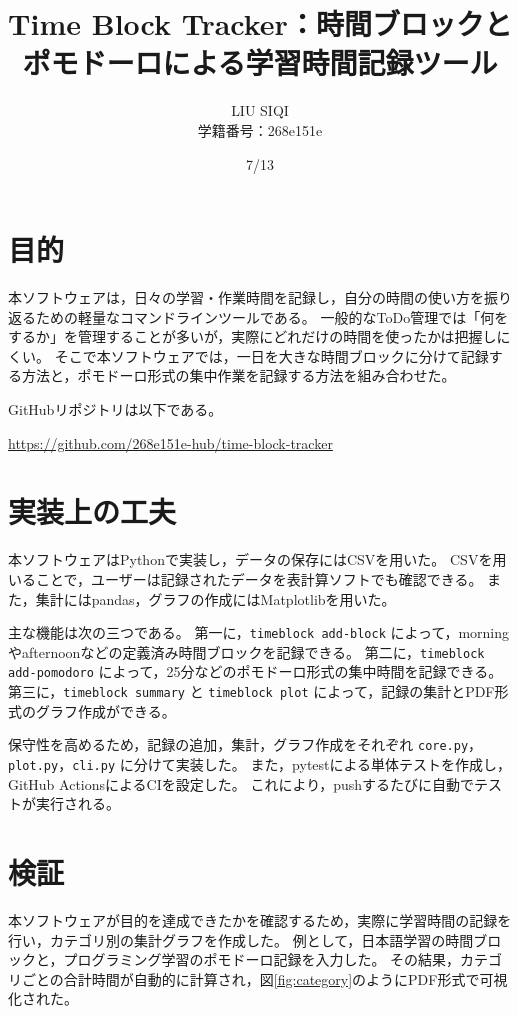 \documentclass[a4paper,10pt]{article}
\title{Time Block Tracker：時間ブロックとポモドーロによる学習時間記録ツール}
\author{LIU SIQI \\ 学籍番号：268e151e}
\date{7/13}
\begin{document}
\maketitle

\section{目的}

本ソフトウェアは，日々の学習・作業時間を記録し，自分の時間の使い方を振り返るための軽量なコマンドラインツールである。
一般的なToDo管理では「何をするか」を管理することが多いが，実際にどれだけの時間を使ったかは把握しにくい。
そこで本ソフトウェアでは，一日を大きな時間ブロックに分けて記録する方法と，ポモドーロ形式の集中作業を記録する方法を組み合わせた。

GitHubリポジトリは以下である。

\begin{center}
\url{https://github.com/268e151e-hub/time-block-tracker}
\end{center}

\section{実装上の工夫}

本ソフトウェアはPythonで実装し，データの保存にはCSVを用いた。
CSVを用いることで，ユーザーは記録されたデータを表計算ソフトでも確認できる。
また，集計にはpandas，グラフの作成にはMatplotlibを用いた。

主な機能は次の三つである。
第一に，\texttt{timeblock add-block} によって，morningやafternoonなどの定義済み時間ブロックを記録できる。
第二に，\texttt{timeblock add-pomodoro} によって，25分などのポモドーロ形式の集中時間を記録できる。
第三に，\texttt{timeblock summary} と \texttt{timeblock plot} によって，記録の集計とPDF形式のグラフ作成ができる。

保守性を高めるため，記録の追加，集計，グラフ作成をそれぞれ \texttt{core.py}，\texttt{plot.py}，\texttt{cli.py} に分けて実装した。
また，pytestによる単体テストを作成し，GitHub ActionsによるCIを設定した。
これにより，pushするたびに自動でテストが実行される。

\section{検証}

本ソフトウェアが目的を達成できたかを確認するため，実際に学習時間の記録を行い，カテゴリ別の集計グラフを作成した。
例として，日本語学習の時間ブロックと，プログラミング学習のポモドーロ記録を入力した。
その結果，カテゴリごとの合計時間が自動的に計算され，図\ref{fig:category}のようにPDF形式で可視化された。
\end{document}
